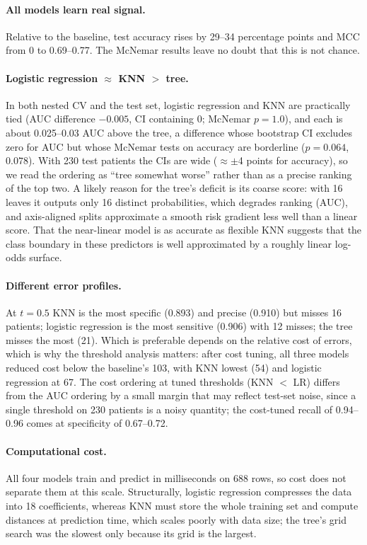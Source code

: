 \documentclass[12pt,a4paper]{article}
\begin{document}
\paragraph{All models learn real signal.} Relative to the baseline, test accuracy rises by 29--34 percentage points and MCC from 0 to 0.69--0.77. The McNemar results leave no doubt that this is not chance.

\paragraph{Logistic regression $\approx$ KNN $>$ tree.} In both nested CV and the test set, logistic regression and KNN are practically tied (AUC difference $-0.005$, CI containing 0; McNemar $p=1.0$), and each is about 0.025--0.03 AUC above the tree, a difference whose bootstrap CI excludes zero for AUC but whose McNemar tests on accuracy are borderline ($p=0.064$, $0.078$). With 230 test patients the CIs are wide ($\approx\pm$4 points for accuracy), so we read the ordering as ``tree somewhat worse'' rather than as a precise ranking of the top two. A likely reason for the tree's deficit is its coarse score: with 16 leaves it outputs only 16 distinct probabilities, which degrades ranking (AUC), and axis-aligned splits approximate a smooth risk gradient less well than a linear score. That the near-linear model is as accurate as flexible KNN suggests that the class boundary in these predictors is well approximated by a roughly linear log-odds surface.

\paragraph{Different error profiles.} At $t=0.5$ KNN is the most specific (0.893) and precise (0.910) but misses 16 patients; logistic regression is the most sensitive (0.906) with 12 misses; the tree misses the most (21). Which is preferable depends on the relative cost of errors, which is why the threshold analysis matters: after cost tuning, all three models reduced cost below the baseline's 103, with KNN lowest (54) and logistic regression at 67. The cost ordering at tuned thresholds (KNN $<$ LR) differs from the AUC ordering by a small margin that may reflect test-set noise, since a single threshold on 230 patients is a noisy quantity; the cost-tuned recall of 0.94--0.96 comes at specificity of 0.67--0.72.

\paragraph{Computational cost.} All four models train and predict in milliseconds on 688 rows, so cost does not separate them at this scale. Structurally, logistic regression compresses the data into 18 coefficients, whereas KNN must store the whole training set and compute distances at prediction time, which scales poorly with data size; the tree's grid search was the slowest only because its grid is the largest.
\end{document}
